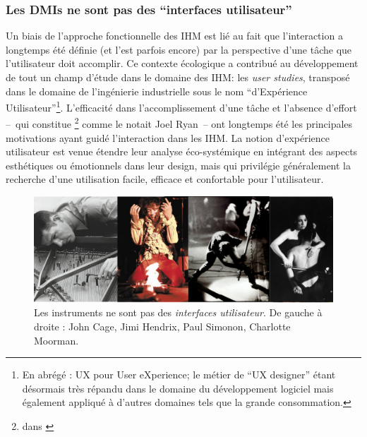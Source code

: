 \subsubsection{Les DMIs ne sont pas des ``interfaces utilisateur''}

\noindent Un biais de l'approche fonctionnelle des \gls{IHM} est lié au fait que l'interaction a longtemps été définie (et l'est parfois encore) par la perspective d'une tâche que l'utilisateur doit accomplir. Ce contexte écologique a contribué au développement de tout un champ d'étude dans le domaine des \gls{IHM}: les \textit{user studies}, transposé dans le domaine de l'ingénierie industrielle sous le nom ``d'Expérience Utilisateur''\footnote{En abrégé : UX pour User eXperience; le métier de ``UX designer'' étant désormais très répandu dans le domaine du développement logiciel mais également appliqué à d'autres domaines tels que la grande consommation.}. L'efficacité dans l'accomplissement d'une tâche et l'absence d'effort --~qui constitue \footnote{ dans \cite{ryan_remarks_1991}} comme le notait Joel Ryan~-- ont longtemps été les principales motivations ayant guidé l'interaction dans les \gls{IHM}. La notion d'expérience utilisateur est venue étendre leur analyse éco-systémique en intégrant des aspects esthétiques ou émotionnels dans leur design, mais qui privilégie généralement la recherche d'une utilisation facile, efficace et confortable pour l'utilisateur.\\
\begin{figure}[!htbp]
	\captionsetup{format=plain}%
	\includegraphics[width=\textwidth]{gfx/03_gesture/instrumentabusers.png}
	\caption[Les instruments ne sont pas des interfaces utilisateur]{Les instruments ne sont pas des \textit{interfaces utilisateur}. De gauche à droite : John Cage, Jimi Hendrix, Paul Simonon, Charlotte Moorman.}
	\label{fig:gesture:abusers}
\end{figure}
